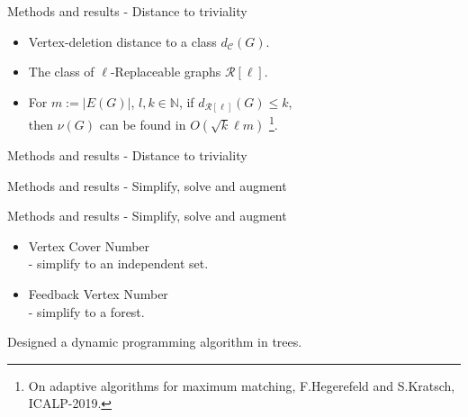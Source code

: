 \documentclass{beamer}
\begin{document}
\begin{frame}[t]{Methods and results - Distance to triviality}
\vspace{.5cm}
	\begin{itemize}
	\item Vertex-deletion distance to a class $d_{\mathcal{C}}(G)$.
	\item The class of $\ell$-Replaceable graphs $\mathcal{R}[\ell]$.
	\item For $m := |E(G)|$, $l, k \in \mathbb{N}$,  if $d_{\mathcal{R}[\ell]}(G) \leq k$,\\
		\hspace{.5cm} then $\nu(G)$ can be found in $O(\sqrt{k}\ell m)$
		\footnote{On adaptive algorithms for maximum matching, F.Hegerefeld and S.Kratsch, ICALP-2019.}.
	\end{itemize}
\end{frame}
\begin{frame}[t]{Methods and results - Distance to triviality}
\vspace{.5cm}
\end{frame}

\begin{frame}{Methods and results - Simplify, solve and augment}
\end{frame}
\begin{frame}[t]{Methods and results - Simplify, solve and augment}
\vspace{.5cm}
	\begin{itemize}
		\item Vertex Cover Number\\ \hspace{.5cm} - simplify to an independent set.
		\item Feedback Vertex Number\\ \hspace{.5cm} - simplify to a forest.
	\end{itemize}
	Designed a dynamic programming algorithm in trees.
\end{frame}
\end{document}
